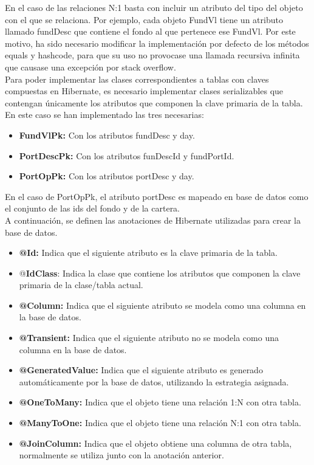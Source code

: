 \documentclass[12pt, a4paper]{book}
\begin{document}
\newpage

En el caso de las relaciones N:1 basta con incluir un atributo del tipo del objeto con el que se relaciona. Por ejemplo, cada objeto FundVl tiene un atributo llamado fundDesc que contiene el fondo al que pertenece ese FundVl. Por este motivo, ha sido necesario modificar la implementación por defecto de los métodos equals y hashcode, para que su uso no provocase una llamada recursiva infinita que causase una excepción por stack overflow.\\


Para poder implementar las clases correspondientes a tablas con claves compuestas en Hibernate, es necesario implementar clases serializables que contengan únicamente los atributos que componen la clave primaria de la tabla. En este caso se han implementado las tres necesarias: %

\begin{itemize}
	\item \textbf{FundVlPk:} Con los atributos fundDesc y day.
	\item \textbf{PortDescPk:} Con los atributos funDescId y fundPortId.
	\item \textbf{PortOpPk:} Con los atributos portDesc y day.
\end{itemize}

En el caso de PortOpPk, el atributo portDesc es mapeado en base de datos como el conjunto de las ids del fondo y de la cartera.\\

A continuación, se definen las anotaciones de Hibernate utilizadas para crear la base de datos.

\begin{itemize}
	\item \textbf{@Id:} Indica que el siguiente atributo es la clave primaria de la tabla.
	\item @\textbf{IdClass}: Indica la clase que contiene los atributos que componen la clave primaria de la clase/tabla actual.
	\item  \textbf{@Column:} Indica que el siguiente atributo se modela como una columna en la base de datos.
	\item  \textbf{@Transient:} Indica que el siguiente atributo no se modela como una columna en la base de datos.
	\item \textbf{@GeneratedValue:} Indica que el siguiente atributo es generado automáticamente por la base de datos, utilizando la estrategia asignada.
	\item \textbf{@OneToMany:} Indica que el objeto tiene una relación 1:N con otra tabla.
	\item\textbf{@ManyToOne:} Indica que el objeto tiene una relación N:1 con otra tabla.
	\item\textbf{@JoinColumn:} Indica que el objeto obtiene una columna de otra tabla, normalmente se utiliza junto con la anotación anterior.\\
\end{itemize}
\end{document}
